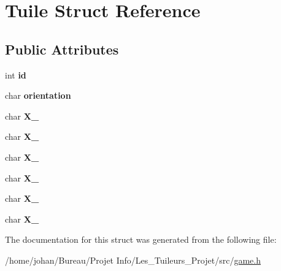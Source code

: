 \hypertarget{structTuile}{}\section{Tuile Struct Reference}
\label{structTuile}
\subsection*{Public Attributes}
\begin{DoxyCompactItemize}
\item 
int {\bfseries id}\hypertarget{structTuile_a45754810cef2273dd533138572fd69d3}{}\label{structTuile_a45754810cef2273dd533138572fd69d3}

\item 
char {\bfseries orientation}\hypertarget{structTuile_a35df68a87931e7230087f43452f2636b}{}\label{structTuile_a35df68a87931e7230087f43452f2636b}

\item 
char {\bfseries X\+\_}\hypertarget{structTuile_a33d2a0d532346421afa9a2a90c254a0c}{}\label{structTuile_a33d2a0d532346421afa9a2a90c254a0c}

\item 
char {\bfseries X\+\_}\hypertarget{structTuile_a41e9a4c908d5ee5ab73c41d1d80901bd}{}\label{structTuile_a41e9a4c908d5ee5ab73c41d1d80901bd}

\item 
char {\bfseries X\+\_}\hypertarget{structTuile_a3e98f6d39d1b6a2a058e49ee1b834d30}{}\label{structTuile_a3e98f6d39d1b6a2a058e49ee1b834d30}

\item 
char {\bfseries X\+\_}\hypertarget{structTuile_ac4a02540c448a7162c9c079ae89a9f44}{}\label{structTuile_ac4a02540c448a7162c9c079ae89a9f44}

\item 
char {\bfseries X\+\_}\hypertarget{structTuile_a000249e10ae9e530221a112bd64c923c}{}\label{structTuile_a000249e10ae9e530221a112bd64c923c}

\item 
char {\bfseries X\+\_}\hypertarget{structTuile_aefe1f935f40ff71bb9d2c0effd46e1a7}{}\label{structTuile_aefe1f935f40ff71bb9d2c0effd46e1a7}

\end{DoxyCompactItemize}


The documentation for this struct was generated from the following file\+:\begin{DoxyCompactItemize}
\item 
/home/johan/\+Bureau/\+Projet Info/\+Les\+\_\+\+Tuileurs\+\_\+\+Projet/src/\hyperlink{game_8h}{game.\+h}\end{DoxyCompactItemize}
